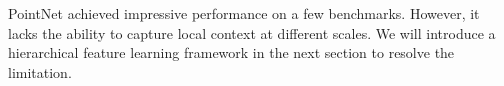 


PointNet achieved impressive performance on a few benchmarks. However, it lacks the ability to capture local context at different scales. We will introduce a hierarchical feature learning framework in the next section to resolve the limitation.    


